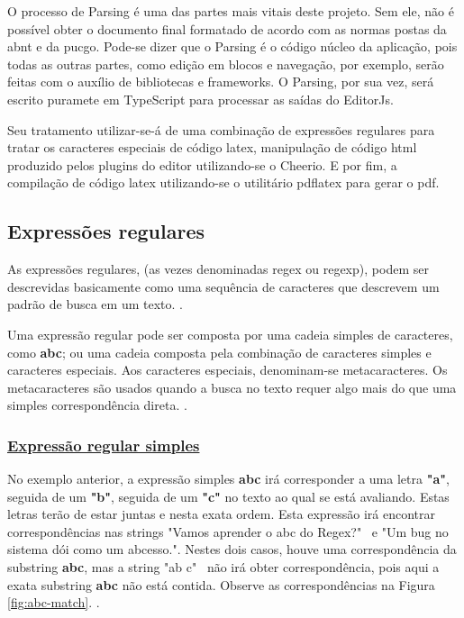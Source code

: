 O processo de Parsing é uma das partes mais vitais deste projeto.
Sem ele, não é possível obter o documento final formatado de acordo
com as normas postas da
\acrshort{abnt}
e da
\acrshort{pucgo}.
Pode-se dizer que o Parsing é o código núcleo da aplicação, pois todas
as outras partes, como edição em blocos e navegação, por exemplo,
serão feitas com o auxílio de bibliotecas e frameworks. O Parsing,
por sua vez, será escrito puramete em TypeScript para processar as
saídas do EditorJs.

Seu tratamento utilizar-se-á de uma combinação de expressões regulares
para tratar os caracteres especiais de código
\acrshort{latex},
manipulação de código
\acrshort{html}
produzido pelos plugins do editor utilizando-se o Cheerio.
E por fim, a compilação de código
\acrshort{latex}
utilizando-se o utilitário pdflatex
para gerar o
\acrshort{pdf}.

\subsection{Expressões regulares}

As expressões regulares, (as vezes denominadas
\acrshort{regex}
ou
\acrshort{regexp}),
podem ser descrevidas basicamente como uma sequência de
caracteres que descrevem um padrão de busca em um texto.
\cite{dp6-regex}.

Uma expressão regular pode ser composta por uma cadeia simples de caracteres, como
\textbf{abc};
ou uma cadeia composta pela combinação de caracteres simples e caracteres especiais.
Aos caracteres especiais, denominam-se metacaracteres. Os metacaracteres são usados
quando a busca no texto requer algo mais do que uma simples correspondência direta.
\cite{mdn-regex}.

\subsubsection{\underline{Expressão regular simples}}

No exemplo anterior, a expressão simples
\textbf{abc}
irá corresponder a uma letra
\textbf{"a"},
seguida de um
\textbf{"b"},
seguida de um
\textbf{"c"}
no texto ao qual se está avaliando.
Estas letras terão de estar juntas e nesta exata ordem.
Esta expressão irá encontrar correspondências nas strings
"Vamos aprender o abc do Regex?"~
e
"Um bug no sistema dói como um abcesso.".
Nestes dois casos, houve uma correspondência da substring
\textbf{abc},
mas a string
"ab c"~
não irá obter correspondência, pois aqui a exata substring
\textbf{abc}
não está contida. Observe as correspondências na
Figura \ref{fig:abc-match}.
\cite{mdn-regex}.


